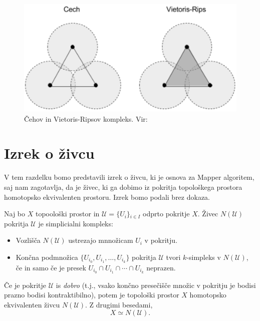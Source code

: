 \begin{figure}[H]
    \centering
    \includegraphics[width=0.7\linewidth]{resources/cech-vs-vietoris-rips-complex.png}
    \caption{Čehov in Vietoris-Ripsov kompleks. Vir:~\cite{justinmath_persistent_homology}}\label{fig:backprop2}
\end{figure}

\section{Izrek o živcu}
V tem razdelku bomo predstavili izrek o živcu, ki je osnova za Mapper algoritem, saj nam zagotavlja, da je živec, ki ga dobimo iz pokritja topološkega prostora homotopsko ekvivalenten prostoru. Izrek bomo podali brez dokaza.~\cite{GuzeljBlatnik2020}

\begin{izrek}
Naj bo \( X \) topoološki prostor in \( \mathcal{U} = \{ U_i \}{}_{i \in I} \) odprto pokritje \( X \). Živec \( N(\mathcal{U}) \) pokritja \( \mathcal{U} \) je simplicialni kompleks:
\begin{itemize}
    \item Vozlišča \( N(\mathcal{U}) \) ustrezajo mnnožicam \( U_i \) v pokritju.
    \item Končna podmnožica \( \{ U_{i_0}, U_{i_1}, \ldots, U_{i_k} \} \) pokritja \( \mathcal{U} \) tvori \( k \)-simpleks v \( N(\mathcal{U}) \), če in samo če je presek \( U_{i_0} \cap U_{i_1} \cap \cdots \cap U_{i_k} \) neprazen.
\end{itemize}
Če je pokritje \( \mathcal{U} \) is \textit{dobro} (t.j., vsako končno presečišče množic v pokritju je bodisi prazno bodisi kontraktibilno), potem je topološki prostor \( X \) homotopsko ekvivalenten živcu \( N(\mathcal{U}) \). Z drugimi besedami,
\[ X \simeq N(\mathcal{U}). \]
\end{izrek}